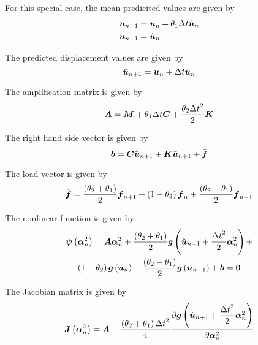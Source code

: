 For this special case, the mean predicited values are given by
\begin{equation}
  \begin{split}
    \bar{\boldsymbol{u}}_{n+1} &= \boldsymbol{u}_{n}+\theta_{1}\Delta t\dot{\boldsymbol{u}}_{n}\\
    \dot{\bar{\boldsymbol{u}}}_{n+1} &= \dot{\boldsymbol{u}}_{n}
  \end{split}
\end{equation}

The predicted displacement values are given by
\begin{equation}
   \hat{\boldsymbol{u}}_{n+1} = \boldsymbol{u}_{n}+\Delta t\dot{\boldsymbol{u}}_{n}
\end{equation}

The amplification matrix is given by
\begin{equation}
  \matr{A}=\matr{M}+\theta_{1}\Delta t\matr{C}+\dfrac{\theta_{2}{\Delta t}^{2}}{2}\matr{K}
\end{equation}

The right hand side vector is given by
\begin{equation}
  \vectr{b}=\matr{C}\dot{\bar{\vectr{u}}}_{n+1}+\matr{K}\bar{\vectr{u}}_{n+1}+\bar{\vectr{f}}
\end{equation}

The load vector is given by
\begin{equation}
  \bar{\boldsymbol{f}}=\dfrac{\left( \theta_{2}+\theta_{1} \right)}{2}\boldsymbol{f}_{n+1}+\left( 1-\theta_{2} \right)\boldsymbol{f}_{n}
  +\dfrac{\left( \theta_{2}-\theta_{1} \right)}{2}\boldsymbol{f}_{n-1}
\end{equation}

The nonlinear function is given by
\begin{multline}
  \fnof{\vectr{\psi}}{\vectr{\alpha}^{2}_{n}}=\matr{A}\vectr{\alpha}^{2}_{n}+\dfrac{\pbrac{\theta_{2}+\theta_{1}}}{2}\fnof{\vectr{g}}{\hat{\vectr{u}}_{n+1}+
    \dfrac{{\Delta t}^{2}}{2}\vectr{\alpha}^{2}_{n}}+\\
  \pbrac{1-\theta_{2}}\fnof{\vectr{g}}{\vectr{u}_{n}}+\dfrac{\pbrac{\theta_{2}-\theta_{1}}}{2}\fnof{\vectr{g}}{\vectr{u}_{n-1}}+\vectr{b}=\vectr{0}
\end{multline}

The Jacobian matrix is given by
\begin{equation}
  \fnof{\matr{J}}{\vectr{\alpha}^{2}_{n}}=\matr{A}+\dfrac{\pbrac{\theta_{2}+\theta_{1}}{\Delta t}^{2}}{4}
  \delby{\fnof{\vectr{g}}{\hat{\vectr{u}}_{n+1}+\dfrac{{\Delta t}^{2}}{2}\vectr{\alpha}^{2}_{n}}}{\vectr{\alpha}^{2}_{n}}
\end{equation}


